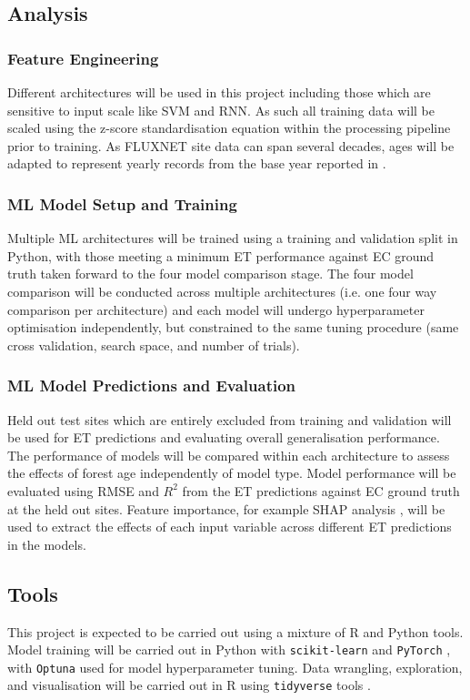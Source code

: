 \subsection{Analysis}
\subsubsection{Feature Engineering}
Different architectures will be used in this project including those which are sensitive to input scale like SVM and RNN. As such all training data will be scaled using the z-score standardisation equation within the processing pipeline prior to training. As FLUXNET site data can span several decades, ages will be adapted to represent yearly records from the base year reported in \textcite{besnard2018}.

\subsubsection{ML Model Setup and Training}
Multiple ML architectures will be trained using a training and validation split in Python, with those meeting a minimum ET performance against EC ground truth taken forward to the four model comparison stage. The four model comparison will be conducted across multiple architectures (i.e. one four way comparison per architecture) and each model will undergo hyperparameter optimisation independently, but constrained to the same tuning procedure (same cross validation, search space, and number of trials). 

\subsubsection{ML Model Predictions and Evaluation}
Held out test sites which are entirely excluded from training and validation will be used for ET predictions and evaluating overall generalisation performance. The performance of models will be compared within each architecture to assess the effects of forest age independently of model type. Model performance will be evaluated using RMSE and $R^2$ from the ET predictions against EC ground truth at the held out sites. Feature importance, for example SHAP analysis \parencite{lundberg2017unified}, will be used to extract the effects of each input variable across different ET predictions in the models.

\subsection{Tools}
This project is expected to be carried out using a mixture of R and Python tools. Model training will be carried out in Python with \texttt{scikit-learn} \parencite{pedregosa2011scikit} and \texttt{PyTorch} \parencite{paszke2019pytorch}, with \texttt{Optuna} \parencite{akiba2019optuna} used for model hyperparameter tuning. Data wrangling, exploration, and visualisation will be carried out in R using \texttt{tidyverse} tools \parencite{wickham2019welcome}. 

